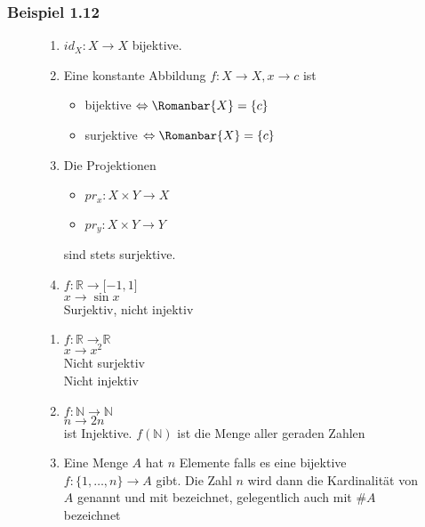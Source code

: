 \subsubsection*{Beispiel 1.12}
\begin{figure}[ht]

\begin{minipage}[b]{0.45\linewidth}
\centering
\begin{enumerate}
\item $id_{X}:X\rightarrow X$ bijektive.
\item Eine konstante Abbildung $f:X\rightarrow X, x\rightarrow c$ ist 
\begin{itemize}
\item bijektive $\Leftrightarrow \Romanbar{X}=\{ c\}$
\item surjektive $\Leftrightarrow \Romanbar{X}=\{ c\}$
\end{itemize}
\item Die Projektionen 
\begin{itemize}
\item $pr_x : X\times Y\rightarrow X$ 
\item $pr_y : X\times Y\rightarrow Y$ 
\end{itemize}
sind stets surjektive.
\item $f:\mathbb{R}\rightarrow\lbrack -1,1\rbrack$ \\
$x\rightarrow \sin x$\\
Surjektiv, nicht injektiv
\end{enumerate}
\end{minipage}
\hspace{0.5cm}
\begin{minipage}[b]{0.45\linewidth}
\centering
\begin{enumerate}
\item $f:\mathbb{R}\rightarrow\mathbb{R}$\\
$x\rightarrow x^2$\\
Nicht surjektiv\\
Nicht injektiv

\item $f:\mathbb{N}\rightarrow\mathbb{N}$\\
$n\rightarrow 2n$\\
ist Injektive. $f(\mathbb{N})$ ist die Menge aller geraden Zahlen
\item Eine Menge $A$ hat $n$ Elemente falls es eine bijektive $f:\{1,\dots,n\}\rightarrow A$ gibt. Die Zahl $n$ wird dann die Kardinalität von $A$ genannt und mit  bezeichnet, gelegentlich auch mit $\#A$ bezeichnet


\end{enumerate}
\end{minipage}
\end{figure}

